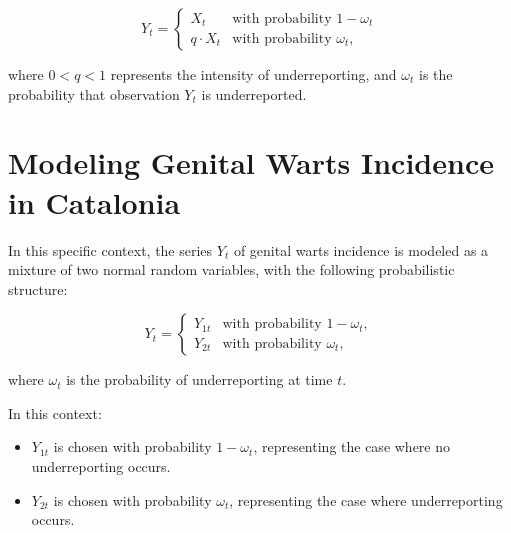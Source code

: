\documentclass[acmsmall, nonacm]{acmart}
\begin{document}
\[
Y_t = 
\begin{cases} 
X_t & \text{with probability } 1 - \omega_t \\ 
q \cdot X_t & \text{with probability } \omega_t,
\end{cases}
\]

where \( 0 < q < 1 \) represents the intensity of underreporting, and \( \omega_t \) is the probability that observation \( Y_t \) is underreported.

\section{Modeling Genital Warts Incidence in Catalonia}

In this specific context, the series \( Y_t \) of genital warts incidence is modeled as a mixture of two normal random variables, with the following probabilistic structure:

\[
Y_t = 
\begin{cases} 
Y_{1t} & \text{with probability } 1 - \omega_t, \\ 
Y_{2t} & \text{with probability } \omega_t,
\end{cases}
\]

where \( \omega_t \) is the probability of underreporting at time \( t \).

In this context:

\begin{itemize}
    \item \( Y_{1t} \) is chosen with probability \( 1 - \omega_t \), representing the case where no underreporting occurs.
    \item \( Y_{2t} \) is chosen with probability \( \omega_t \), representing the case where underreporting occurs.
\end{itemize}
\end{document}
